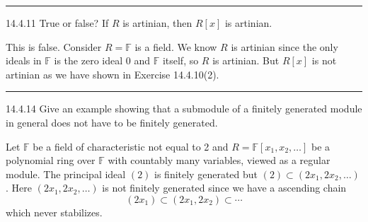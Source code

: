 \documentclass[a4paper, 12pt]{article}
\begin{document}
\noindent\rule{7in}{2.8pt}
\begin{problem}{14.4.11}
True or false? If \(R\) is artinian, then \(R[x]\) is artinian.
\end{problem}
\begin{solution}
This is false. Consider \(R=\mathbb{F}\) is a field. We know \(R\) is artinian since the only ideals in \(\mathbb{F}\) is the zero ideal \(0\) and \(\mathbb{F}\) itself, so \(R\) is artinian. But \(R[x]\) is not artinian as we have shown in 
Exercise 14.4.10(2). 
\end{solution}

\noindent\rule{7in}{2.8pt}
\begin{problem}{14.4.14}
Give an example showing that a submodule of a finitely generated module in general does not have to be finitely generated.
\end{problem}
\begin{solution}
Let \(\mathbb{F}\) be a field of characteristic not equal to 2 and \(R=\mathbb{F}[x_1,x_2,\ldots]\) be a polynomial ring over \(\mathbb{F}\) with countably many variables, viewed as a regular module. The principal ideal \((2)\) is finitely generated but 
\((2)\subset (2x_1,2x_2,\ldots)\). Here \((2x_1,2x_2,\ldots)\) is not finitely generated since we have a ascending chain 
\[(2x_1)\subset (2x_1,2x_2)\subset \cdots\]
which never stabilizes.  
\end{solution}
\end{document}
